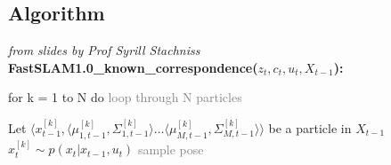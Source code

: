 \documentclass{article}
\begin{document}
\subsection{Algorithm}
\textit{from slides by Prof Syrill Stachniss}\\
\textbf{FastSLAM1.0\_known\_correspondence($z_t,c_t,u_t,X_{t-1}$):}\\
\begin{textit}
    for k = 1 to N do    \hfill      \textcolor{gray}{loop through N particles} \\
    \begin{addmargin}[1em]{2em}
        Let $\langle x_{t-1}^{[k]}, \langle \mu_{1,t-1}^{[k]},\Sigma_{1,t-1}^{[k]} \rangle \dots{} \langle \mu_{M,t-1}^{[k]},\Sigma_{M,t-1}^{[k]} \rangle \rangle$ be a particle in $X_{t-1}$ \\
    
        $x_t^{[k]} \sim p(x_t | x_{t-1},u_{t})$  \hfill \textcolor{gray}{sample pose}\\


\end{addmargin}
\end{textit}
\end{document}
